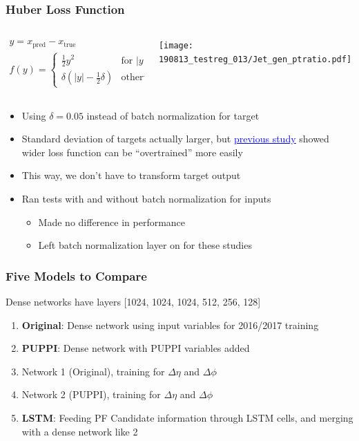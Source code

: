 \documentclass{beamer}
\newcommand{\link}[2]{\href{#2}{\textcolor{blue}{\underline{#1}}}}
\begin{document}
\begin{frame}
  \frametitle{Huber Loss Function}

  \begin{columns}
    \begin{column}{0.5\linewidth}
      \begin{gather*}
        y = x_\mathrm{pred} - x_\mathrm{true} \\
        f(y) = \begin{cases}
          \frac12 y^2 & \mbox{for } |y| < \delta \\
          \delta(|y| - \frac12 \delta) & \mbox{otherwise}
        \end{cases}
      \end{gather*}
    \end{column}
    \begin{column}{0.5\linewidth}
      \texttt{[image: 190813\_testreg\_013/Jet\_gen\_ptratio.pdf]}
    \end{column}
  \end{columns}

  \begin{itemize}
  \item Using $\delta = 0.05$ instead of batch normalization for target
  \item Standard deviation of targets actually larger, but
    \link{previous study}{http://t3serv001.mit.edu/~dabercro/docs/hbb/dabercro_hbb_190611.pdf}
    showed wider loss function can be ``overtrained''
    more easily
  \item This way, we don't have to transform target output
  \item Ran tests with and without batch normalization for inputs
    \begin{itemize}
    \item Made no difference in performance
    \item Left batch normalization layer on for these studies
    \end{itemize}
  \end{itemize}

\end{frame}

\begin{frame}
  \frametitle{Five Models to Compare}

  Dense networks have layers [1024, 1024, 1024, 512, 256, 128]

  \begin{enumerate}
  \item {\bf Original}: Dense network using input variables for 2016/2017 training
  \item {\bf PUPPI}: Dense network with PUPPI variables added
  \item Network 1 (Original), training for $\Delta \eta$ and $\Delta \phi$
  \item Network 2 (PUPPI), training for $\Delta \eta$ and $\Delta \phi$
  \item {\bf LSTM}: Feeding PF Candidate information through LSTM cells,
    and merging with a dense network like 2
  \end{enumerate}

\end{frame}
\end{document}
